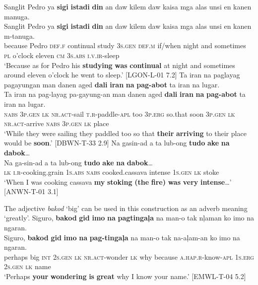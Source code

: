 \ea
Sanglit  Pedro  ya  \textbf{sigi}  \textbf{istadi}  \textbf{din}  an  daw  kilem  daw kaisa  mga  alas  unsi  en  kanen  manuga. \\\smallskip
 \gll Sanglit  Pedro  ya  \textbf{sigi}  \textbf{istadi}  \textbf{din}  an  daw  kilem  daw kaisa  mga  alas  unsi  en  kanen  m-tanuga. \\
because  Pedro  \textsc{def.f}  continual  study  3\textsc{s.gen}  \textsc{def.m}  if/when  night  and
sometimes  \textsc{pl}  o’clock  eleven  \textsc{cm}  3\textsc{s.abs}  \textsc{i.v.ir}-sleep \\
\glt `Because as for Pedro his \textbf{studying} \textbf{was} \textbf{continual} at night and sometimes around eleven o’clock he went to sleep.’ [LGON-L-01 7.2]
\z
\ea
Ta  iran  na  paglayag  pagayungan  man  danen  aged \textbf{dali}  \textbf{iran}  \textbf{na}  \textbf{pag-abot}  ta  iran  na  lugar. \\\smallskip
 \gll Ta  iran  na  pag-layag  pa-gayung-an  man  danen  aged \textbf{dali}  \textbf{iran}  \textbf{na}  \textbf{pag-abot}  ta  iran  na  lugar. \\
\textsc{nabs}  3\textsc{p.gen}  \textsc{lk}  \textsc{nr.act}-sail  \textsc{t.r}-paddle-\textsc{apl}  too  3\textsc{p.erg}  so.that soon  3\textsc{p.gen}  \textsc{lk}  \textsc{nr.act}-arrive  \textsc{nabs}  3\textsc{p.gen}  \textsc{lk}  place \\
\glt `While they were sailing they paddled too so that \textbf{their} \textbf{arriving} to their place would be \textbf{soon}.’ [DBWN-T-33 2.9]
\z
\ea
Na  gasin-ad  a  ta  lub-ong  \textbf{tudo}  \textbf{ake}  \textbf{na}  \textbf{dabok}… \\\smallskip
 \gll Na  ga-sin-ad  a  ta  lub-ong  \textbf{tudo}  \textbf{ake}  \textbf{na}  \textbf{dabok}… \\
\textsc{lk}  \textsc{i.r}-cooking.grain  1\textsc{s.abs}  \textsc{nabs}  cooked.cassava  intense  1\textsc{s.gen}  \textsc{lk}  stoke \\
\glt ‘When I was cooking cassava \textbf{my} \textbf{stoking} \textbf{(the} \textbf{fire)} \textbf{was} \textbf{very} \textbf{intense}…’ [ANWN-T-01 3.1]
\z

The adjective \textit{bakod} ‘big’ can be used in this construction as an adverb meaning ‘greatly’.
\ea
\label{bkm:Ref481737967}
Siguro,  \textbf{bakod}  \textbf{gid}  \textbf{imo}  \textbf{na}  \textbf{pagtingaļa}  na  man-o tak nļaman  ko  imo  na  ngaran. \\\smallskip
 \gll Siguro,  \textbf{bakod}  \textbf{gid}  \textbf{imo}  \textbf{na}  \textbf{pag-tingaļa}  na  man-o tak na-aļam-an  ko  imo  na  ngaran. \\
perhaps  big    \textsc{int}  2\textsc{s.gen}  \textsc{lk}  \textsc{nr.act}-wonder  \textsc{lk}  why
because \textsc{a.hap.r}-know-\textsc{apl}  1\textsc{s.erg}  2\textsc{s.gen}  \textsc{lk}  name \\
\glt ‘Perhaps \textbf{your} \textbf{wondering} \textbf{is} \textbf{great} why I know your name.’ [EMWL-T-04 5.2]
\z

